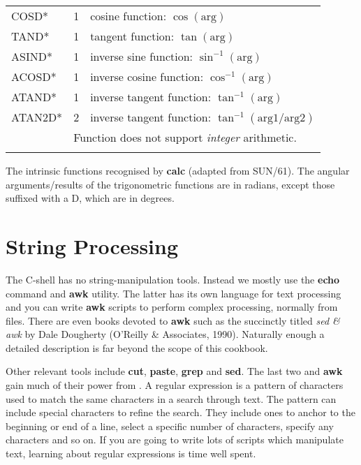 \documentclass[twoside,11pt,nolof]{starlink}
\begin{document}
\begin{center}
\begin{tabular}{lcl}
COSD* & 1 & cosine function: $\cos (\mbox{arg})$ \\
TAND* & 1 & tangent function: $\tan (\mbox{arg})$ \\
ASIND* & 1 & inverse sine function: $\sin ^{-1}(\mbox{arg})$ \\
ACOSD* & 1 & inverse cosine function: $\cos ^{-1}(\mbox{arg})$ \\
ATAND* & 1 & inverse tangent function: $\tan ^{-1}(\mbox{arg})$ \\
ATAN2D* & 2 & inverse tangent function: $\tan ^{-1}(\mbox{arg1/arg2})$ \\
\multicolumn{1}{r}{} &
\multicolumn{2}{l}{\footnotesize *Function does not support \emph{integer}
arithmetic.}\\
\\ \hline
\end{tabular}
\end{center}
The intrinsic functions recognised by \textbf{calc} (adapted from SUN/61).
The angular arguments/results of the trigonometric functions are in
radians, except those suffixed with a D, which are in degrees.
\label{sc4_table:intrinsics}

\newpage
\section{String Processing
\label{sc4_se_string_proc}}

The C-shell has no string-manipulation tools.  Instead we mostly use
the \textbf{echo} command and \textbf{awk} utility.  The latter has its own
language for text processing and you can write \textbf{awk} scripts to
perform complex processing, normally from files.  There are even books
devoted to \textbf{awk} such as the succinctly titled {\sl sed \& awk} by
Dale Dougherty (O'Reilly \& Associates, 1990).  Naturally enough a
detailed description is far beyond the scope of this cookbook.

Other relevant tools include \textbf{cut}, \textbf{paste}, \textbf{grep} and
\textbf{sed}.  The last two and \textbf{awk} gain much of their power from
.  A regular expression
is a pattern of characters used to match the same characters in a
search through text.  The pattern can include special characters to
refine the search.  They include ones to anchor to the beginning or
end of a line, select a specific number of characters, specify any
characters and so on.  If you are going to write lots of scripts which
manipulate text, learning about regular expressions is time well
spent.
\end{document}
